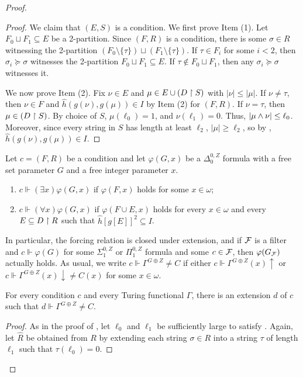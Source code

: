 \begin{proof}
\begin{proof}
We claim that $(E, S)$ is a condition.
We first prove Item (1). Let $F_0 \sqcup F_1 \subseteq E$ be a 2-partition. Since $(F, R)$ is a condition, there is some $\sigma \in R$ witnessing the 2-partition $(F_0 \setminus \{\tau\}) \sqcup  (F_1 \setminus \{\tau\})$. If $\tau \in F_i$ for some $i < 2$, then $\sigma_i \succeq \sigma$ witnesses the 2-partition  $F_0 \sqcup F_1 \subseteq E$. If $\tau \not \in F_0 \sqcup F_1$, then any $\sigma_i \succeq \sigma$ witnesses it.

We now prove Item (2). Fix $\nu \in E$ and $\mu \in E \cup (D \upharpoonright S)$ with $|\nu| \leq |\mu|$. If $\nu \neq \tau$, then $\nu \in F$ and $\hat{h}(g(\nu), g(\mu)) \in I$ by Item (2) for $(F, R)$.
If $\nu = \tau$, then $\mu \in (D \upharpoonright S)$. By choice of $S$, $\mu(\ell_0) = 1$, and $\nu(\ell_1) = 0$. Thus, $|\mu \wedge \nu| \leq \ell_0$. Moreover, since every string in $S$ has length at least $\ell_2$, $|\mu| \geq \ell_2$, so by , $\hat{h}(g(\nu), g(\mu)) \in I$.
\end{proof}

\begin{definition}
Let $c = (F, R)$ be a condition and let $\varphi(G, x)$ be a $\Delta^{0,Z}_0$ formula with a free set parameter $G$ and a free integer parameter $x$.
\begin{enumerate}[1.]
	\item $c \Vdash (\exists x)\varphi(G, x)$ if $\varphi(F, x)$ holds for some $x \in \omega$;
	\item $c \Vdash (\forall x)\varphi(G, x)$ if $\varphi(F \cup E, x)$ holds for every $x \in \omega$ and every $E \subseteq D \upharpoonright R$ such that $\hat{h}[g[E]]^2 \subseteq I$.
\end{enumerate}
\end{definition}

In particular, the forcing relation is closed under extension, and if $\mathcal{F}$ is a filter and $c \Vdash \varphi(G)$ for some $\Sigma^{0,Z}_1$ or $\Pi^{0,Z}_1$ formula and some $c \in \mathcal{F}$, then $\varphi(G_{\mathcal{F}})$ actually holds. As usual, we write $c \Vdash \Gamma^{G \oplus Z} \neq C$ if either $c \Vdash \Gamma^{G \oplus Z}(x)\uparrow$ or $c \Vdash \Gamma^{G \oplus Z}(x)\downarrow \neq C(x)$ for some $x \in \omega$.

\begin{lemma}\label{lem:weak-rado-cone-avoidance-req}
For every condition $c$ and every Turing functional $\Gamma$,
there is an extension $d$ of $c$ such that $d \Vdash \Gamma^{G \oplus Z} \neq C$.
\end{lemma}
\begin{proof}
As in the proof of , let $\ell_0$ and $\ell_1$ be sufficiently large to satisfy . Again, let $\hat{R}$ be obtained from $R$ by extending each string $\sigma \in R$ into a string $\tau$ of length $\ell_1$ such that $\tau(\ell_0) = 0$.


\end{proof}
\end{proof}
